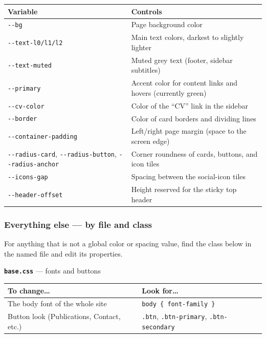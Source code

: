 \documentclass[11pt,a4paper]{article}
\newcommand{\file}[1]{\texttt{#1}}
\begin{document}
\begin{center}
\begin{tabular}{@{}p{4.6cm}p{10.4cm}@{}}
\textbf{Variable} & \textbf{Controls} \\[2pt]
\hline
\rule{0pt}{2.4ex}%
\texttt{-{}-bg}               & Page background color \\[3pt]
\texttt{-{}-text-l0/l1/l2}    & Main text colors, darkest to slightly lighter \\[3pt]
\texttt{-{}-text-muted}       & Muted grey text (footer, sidebar subtitles) \\[3pt]
\texttt{-{}-primary}          & Accent color for content links and hovers (currently green) \\[3pt]
\texttt{-{}-cv-color}         & Color of the ``CV'' link in the sidebar \\[3pt]
\texttt{-{}-border}           & Color of card borders and dividing lines \\[3pt]
\texttt{-{}-container-padding} & Left/right page margin (space to the screen edge) \\[3pt]
\texttt{-{}-radius-card}, \texttt{-{}-radius-button}, \texttt{-{}-radius-anchor} & Corner roundness of cards, buttons, and icon tiles \\[3pt]
\texttt{-{}-icons-gap}        & Spacing between the social-icon tiles \\[3pt]
\texttt{-{}-header-offset}    & Height reserved for the sticky top header \\
\end{tabular}
\end{center}

\subsubsection*{Everything else --- by file and class}

For anything that is not a global color or spacing value, find the class
below in the named file and edit its properties.

\vspace{4pt}
\noindent\textbf{\file{base.css}} --- fonts and buttons
\begin{center}
\begin{tabular}{@{}p{8.0cm}p{7.0cm}@{}}
\textbf{To change\dots} & \textbf{Look for\dots} \\[2pt]
\hline
\rule{0pt}{2.4ex}%
The body font of the whole site & \texttt{body \{ font-family \}} \\[3pt]
Button look (Publications, Contact, etc.) & \texttt{.btn}, \texttt{.btn-primary}, \texttt{.btn-secondary} \\
\end{tabular}
\end{center}
\end{document}

